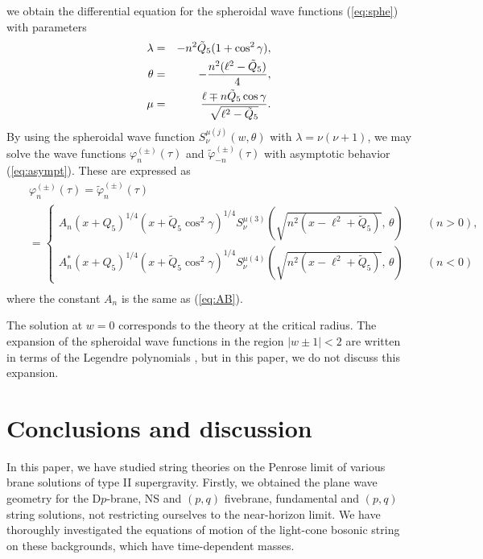 \documentclass[a4paper,12pt]{article}
\begin{document}
we obtain the differential equation for the spheroidal wave functions
(\ref{eq:sphe}) with parameters
\begin{eqnarray}
 \lambda&=& -n^2\tilde{Q}_{5}(1+\cos^2\gamma),\nonumber\\
 \theta&=&-{n^2(\ell^2-\tilde{Q}_{5})\over 4},\nonumber\\
\mu&=&  
{\ell \mp n \tilde{Q}_{5}\cos\gamma\over \sqrt{
\ell^2-\tilde{Q}_{5}}}.
\end{eqnarray}
By using the spheroidal wave function $S^{\mu (j)}_{\nu}(w,\theta)$
with $\lambda=\nu(\nu+1)$,
we may solve 
the wave functions $\varphi_{n}^{(\pm)}(\tau)$ and 
$\tilde{\varphi}_{-n}^{(\pm)}(\tau)$
with asymptotic behavior (\ref{eq:asympt}).
These are expressed as
\begin{eqnarray}
&& \varphi^{(\pm)}_{n}(\tau)=\tilde{\varphi}^{(\pm)}_{n}(\tau) 
\nonumber \\
&&=
\left\{
\begin{array}{l}
A_{n}(x+Q_{5})^{1/4}
(x+\tilde{Q}_{5}\cos^2\gamma)^{1/4}
S^{\mu (3)}_{\nu}(\sqrt{n^2(x-\ell^2+\tilde{Q}_5)},\,\theta)\qquad (n>0),\\
A_{n}^{\ast}(x+Q_{5})^{1/4}(x+\tilde{Q}_{5}\cos^2\gamma)^{1/4}
S^{\mu (4)}_{\nu}(\sqrt{n^2(x-\ell^2+\tilde{Q}_5)},\,\theta)\qquad (n<0)
\end{array}
\right.\nonumber\\
\end{eqnarray}
where the constant
 $A_{n}$ is the same as (\ref{eq:AB}).

The solution at $w=0$ corresponds to the theory at the critical
radius. The expansion of the spheroidal wave functions 
in the region $|w\pm 1|<2$ are written in terms of the
Legendre polynomials \cite{Er,MeSc}, but in this paper,
we do not discuss this expansion. 



\section{Conclusions and discussion}
In this paper, we have studied string theories on the Penrose 
limit of various brane solutions of type II supergravity.
Firstly, we obtained the plane wave geometry for the D$p$-brane,
NS and $(p,q)$ fivebrane, fundamental and $(p,q)$ string
solutions, not restricting ourselves to the 
near-horizon limit. 
We have thoroughly investigated the equations of motion of 
the light-cone bosonic string on these backgrounds, which have
time-dependent masses. 
\end{document}
